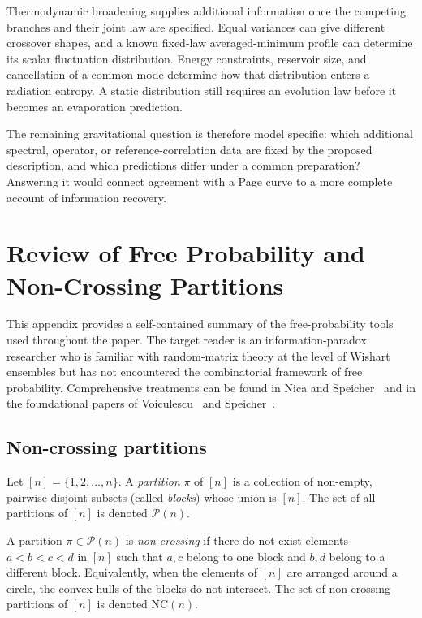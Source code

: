 \documentclass[11pt,letterpaper]{article}
\theoremstyle{plain}
\theoremstyle{definition}
\theoremstyle{remark}
\begin{document}
Thermodynamic broadening supplies additional information once the
competing branches and their joint law are specified. Equal variances
can give different crossover shapes, and a known fixed-law
averaged-minimum profile can determine its scalar fluctuation
distribution. Energy constraints, reservoir size, and cancellation of
a common mode determine how that distribution enters a radiation
entropy. A static distribution still requires an evolution law before
it becomes an evaporation prediction.

The remaining gravitational question is therefore model specific:
which additional spectral, operator, or reference-correlation data are
fixed by the proposed description, and which predictions differ under
a common preparation? Answering it would connect agreement with a Page
curve to a more complete account of information recovery.

\appendix
\section{Review of Free Probability and Non-Crossing Partitions}
\label{sec11:appendix_free_prob}

This appendix provides a self-contained summary of the free-probability
tools used throughout the paper.  The target reader is an
information-paradox researcher who is familiar with random-matrix theory
at the level of Wishart ensembles but has not encountered the
combinatorial framework of free probability.  Comprehensive treatments
can be found in Nica and Speicher~\cite{nicaspeicher2006} and in the
foundational papers of Voiculescu~\cite{voiculescu1991} and
Speicher~\cite{speicher1994}.

\subsection{Non-crossing partitions}
\label{subsec11:non_crossing}

Let $[n] = \{1,2,\ldots,n\}$.  A \emph{partition} $\pi$ of $[n]$ is a
collection of non-empty, pairwise disjoint subsets (called \emph{blocks})
whose union is $[n]$.  The set of all partitions of $[n]$ is denoted
$\mathcal{P}(n)$.

A partition $\pi \in \mathcal{P}(n)$ is \emph{non-crossing} if there do
not exist elements $a < b < c < d$ in $[n]$ such that $a,c$ belong to
one block and $b,d$ belong to a different block.  Equivalently, when the
elements of $[n]$ are arranged around a circle, the convex hulls of the
blocks do not intersect.  The set of non-crossing partitions of $[n]$ is
denoted $\mathrm{NC}(n)$.
\end{document}
